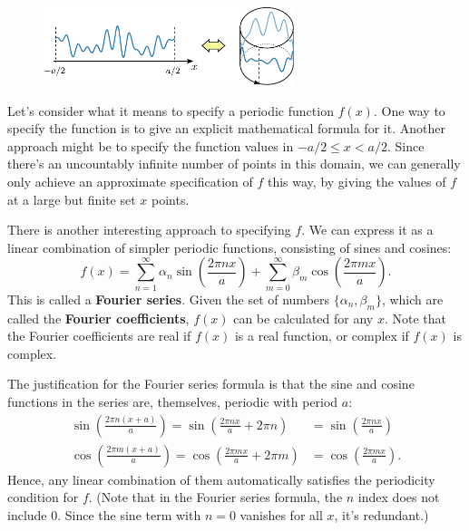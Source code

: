 \documentclass[10pt,a4paper]{article}
\begin{document}
\begin{figure}[ht]
  \centering\includegraphics[width=0.65\textwidth]{periodic_ring}
\end{figure}

\noindent
Let's consider what it means to specify a periodic function $f(x)$.
One way to specify the function is to give an explicit mathematical
formula for it. Another approach might be to specify the function values
in $-a/2 \le x < a/2$. Since there's an uncountably infinite number of
points in this domain, we can generally only achieve an approximate
specification of $f$ this way, by giving the values of $f$ at a
large but finite set $x$ points.

There is another interesting approach to specifying $f$. We can
express it as a linear combination of simpler periodic functions,
consisting of sines and cosines:
\begin{equation}
f(x) = \sum_{n=1}^\infty \alpha_n \sin\left(\frac{2\pi n x}{a}\right) + \sum_{m=0}^\infty \beta_m \cos\left(\frac{2 \pi m x}{a}\right).
\end{equation}
This is called a \textbf{Fourier series}. Given the set of numbers
$\{\alpha_n, \beta_m\}$, which are called the \textbf{Fourier
coefficients}, $f(x)$ can be calculated for any $x$. Note that the
Fourier coefficients are real if $f(x)$ is a real function, or complex
if $f(x)$ is complex.

The justification for the Fourier series formula is that the sine and
cosine functions in the series are, themselves, periodic with period
$a$:
\begin{align}
  \sin\left(\frac{2\pi n (x+a)}{a}\right) = \sin\left(\frac{2\pi n x}{a} + 2\pi n\right)
  &= \sin\left(\frac{2\pi n x}{a}\right)
  \\ \cos\left(\frac{2\pi m (x+a)}{a}\right) = \cos\left(\frac{2\pi m x}{a} + 2\pi m\right)
  &= \cos\left(\frac{2\pi m x}{a}\right).
\end{align}
Hence, any linear combination of them automatically satisfies the
periodicity condition for $f$. (Note that in the Fourier series
formula, the $n$ index does not include 0. Since the sine term with
$n = 0$ vanishes for all $x$, it's redundant.)
\end{document}
